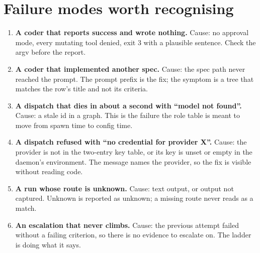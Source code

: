 \section{Failure modes worth recognising}

\begin{enumerate}
	\item \textbf{A coder that reports success and wrote nothing.} Cause: no approval mode,
	every mutating tool denied, exit 3 with a plausible sentence. Check the argv before the
	report.
	\item \textbf{A coder that implemented another spec.} Cause: the spec path never reached
	the prompt. The prompt prefix is the fix; the symptom is a tree that matches the row's
	title and not its criteria.
	\item \textbf{A dispatch that dies in about a second with ``model not found''.} Cause: a
	stale id in a graph. This is the failure the role table is meant to move from spawn time to
	config time.
	\item \textbf{A dispatch refused with ``no credential for provider X''.} Cause: the
	provider is not in the two-entry key table, or its key is unset or empty in the daemon's
	environment. The message names the provider, so the fix is visible without reading code.
	\item \textbf{A run whose route is unknown.} Cause: text output, or output not captured.
	Unknown is reported as unknown; a missing route never reads as a match.
	\item \textbf{An escalation that never climbs.} Cause: the previous attempt failed without
	a failing criterion, so there is no evidence to escalate on. The ladder is doing what it
	says.
\end{enumerate}
